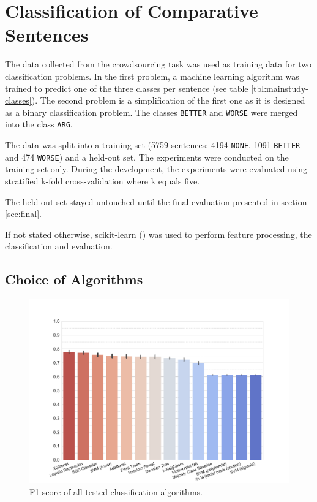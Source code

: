 \chapter{Classification of Comparative Sentences}
The data collected from the crowdsourcing task was used as training data for two classification problems. In the first problem, a machine learning algorithm was trained to predict one of the three classes per sentence (see table \ref{tbl:mainstudy-classes}). The second problem is a simplification of the first one as it is designed as a binary classification problem. The classes \texttt{BETTER} and \texttt{WORSE} were merged into the class \texttt{ARG}.

The data was split into a training set (5759 sentences; 4194 \texttt{NONE}, 1091 \texttt{BETTER} and 474 \texttt{WORSE}) and a held-out set.
The experiments were conducted on the training set only. During the development, the experiments were evaluated using stratified k-fold cross-validation where k equals five. 

The held-out set stayed untouched until the final evaluation presented in section \ref{sec:final}.

If not stated otherwise, scikit-learn (\cite{scikit-learn}) was used to perform feature processing, the classification and evaluation.

\section{Choice of Algorithms}

\begin{figure}[ht]
\centering
\caption{F1 score of all tested classification algorithms.}
\label{tbl:algo}
\includegraphics[width=0.8\linewidth]{images/classifier}
\end{figure}

